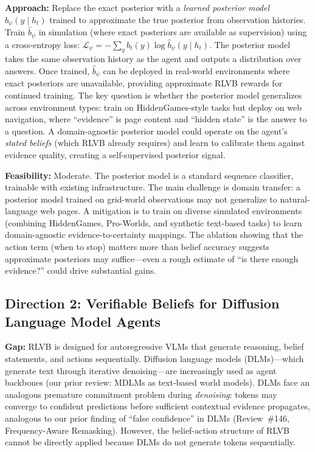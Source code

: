 \documentclass[11pt,a4paper]{article}
\begin{document}
\textbf{Approach:} Replace the exact posterior with a \emph{learned posterior model} $\hat{b}_\psi(y \mid h_t)$ trained to approximate the true posterior from observation histories. Train $\hat{b}_\psi$ in simulation (where exact posteriors are available as supervision) using a cross-entropy loss: $\mathcal{L}_\psi = -\sum_y b_t(y)\log\hat{b}_\psi(y \mid h_t)$. The posterior model takes the same observation history as the agent and outputs a distribution over answers. Once trained, $\hat{b}_\psi$ can be deployed in real-world environments where exact posteriors are unavailable, providing approximate RLVB rewards for continued training. The key question is whether the posterior model generalizes across environment types: train on HiddenGames-style tasks but deploy on web navigation, where ``evidence'' is page content and ``hidden state'' is the answer to a question. A domain-agnostic posterior model could operate on the agent's \emph{stated beliefs} (which RLVB already requires) and learn to calibrate them against evidence quality, creating a self-supervised posterior signal.

\textbf{Feasibility:} Moderate. The posterior model is a standard sequence classifier, trainable with existing infrastructure. The main challenge is domain transfer: a posterior model trained on grid-world observations may not generalize to natural-language web pages. A mitigation is to train on diverse simulated environments (combining HiddenGames, Pro-Worlds, and synthetic text-based tasks) to learn domain-agnostic evidence-to-certainty mappings. The ablation showing that the action term (when to stop) matters more than belief accuracy suggests approximate posteriors may suffice---even a rough estimate of ``is there enough evidence?'' could drive substantial gains.

\subsection{Direction 2: Verifiable Beliefs for Diffusion Language Model Agents}
\textbf{Gap:} RLVB is designed for autoregressive VLMs that generate reasoning, belief statements, and actions sequentially. Diffusion language models (DLMs)---which generate text through iterative denoising---are increasingly used as agent backbones (our prior review: MDLMs as text-based world models). DLMs face an analogous premature commitment problem during \emph{denoising}: tokens may converge to confident predictions before sufficient contextual evidence propagates, analogous to our prior finding of ``false confidence'' in DLMs (Review~\#146, Frequency-Aware Remasking). However, the belief-action structure of RLVB cannot be directly applied because DLMs do not generate tokens sequentially.
\end{document}
